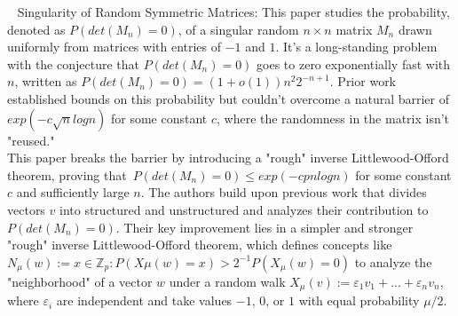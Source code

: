 

\begin{flushleft}
~\cite{campos2020singularity} Singularity of Random Symmetric Matrices: This paper studies the probability, denoted as ${P(det(M_n) = 0)}$, of a singular random ${n \times n}$ matrix ${M_n}$ drawn uniformly from matrices with entries of ${-1}$ and ${1}$. It's a long-standing problem with the conjecture that ${P(det(M_n) = 0)}$ goes to zero exponentially fast with ${n}$, written as ${P(det(M_n) = 0) = (1 + o(1))n^{2}2^{-n+1}}$. Prior work established bounds on this probability but couldn't overcome a natural barrier of ${exp(-c\sqrt{n} log n)}$ for some constant ${c}$, where the randomness in the matrix isn't "reused."\\
This paper breaks the barrier by introducing a "rough" inverse Littlewood-Offord theorem, proving that\ ${P(det(M_n) = 0) \leq exp(-cpn log n)}$ for some constant ${c}$ and sufficiently large ${n}$. The authors build upon previous work that divides vectors ${v}$ into structured and unstructured and analyzes their contribution to ${P(det(M_n) = 0)}$. Their key improvement lies in a simpler and stronger "rough" inverse Littlewood-Offord theorem, which defines concepts like ${N_{\mu}(w) := {x \in \mathbb{Z}_{p} : P(X \mu (w) = x) > 2^{-1}P(X_{\mu}(w) = 0)}}$ to analyze the "neighborhood" of a vector ${w}$ under a random walk ${X_{\mu}(v) := \varepsilon_1 v_1 + ... + \varepsilon_n v_n}$, where ${\varepsilon_i}$ are independent and take values ${-1}$, ${0}$, or ${1}$ with equal probability ${\mu /2}$.
\end{flushleft} 